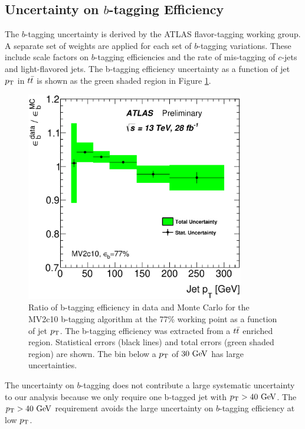 \subsection{Uncertainty on $b$-tagging Efficiency}

\indent  The $b$-tagging uncertainty is derived by the ATLAS flavor-tagging working group.  A separate set of weights are applied for each set of $b$-tagging variations.  These include scale factors on $b$-tagging efficiencies and the rate of mis-tagging of $c$-jets and light-flavored jets. The b-tagging efficiency uncertainty as a function of jet $p_{\mathrm{T}}$ in $t\bar{t}$ is shown as the green shaded region in Figure \ref{fig:sys:btag}. \\

\begin{figure}[!h]
\begin{center}
\includegraphics[width=0.85\textwidth]{figures/JetCalib/MV20c10_btaggingEff.eps}
\caption[Ratio of b-tagging efficiency in data and MC between data and MC.]{Ratio of b-tagging efficiency in data and Monte Carlo for the MV2c10 b-tagging algorithm at the 77\% working point as a function of jet $p_{\mathrm{T}}$. The b-tagging efficiency was extracted from a $t\bar{t}$ enriched region. Statistical errors (black lines) and total errors (green shaded region) are shown. The bin below a $p_{\mathrm{T}}$ of $30\gev$ has large uncertainties.}
\label{fig:sys:btag}
\end{center}
\end{figure}

\indent The uncertainty on $b$-tagging does not contribute a large systematic uncertainty to our analysis because we only require one b-tagged jet with $\pt > 40 \gev$.  The $\pt > 40 \gev$ requirement avoids the large uncertainty on $b$-tagging efficiency at low $p_{\mathrm{T}}$.  

